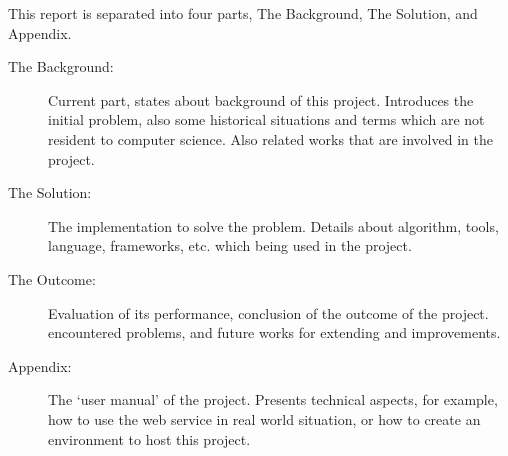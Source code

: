 This report is separated into four parts, The Background, The Solution,
and Appendix.

\begin{description}
\item[The Background:]
  Current part, states about background of this project. Introduces
  the initial problem, also some historical situations and terms
  which are not resident to computer science. Also related works
  that are involved in the project.
\item[The Solution:]
  The implementation to solve the problem. Details about algorithm,
  tools, language, frameworks, etc. which being used in the project.
\item[The Outcome:]
  Evaluation of its performance, conclusion of the outcome of the project.
  encountered problems, and future works for extending and improvements.
\item[Appendix:]
  The `user manual' of the project. Presents technical aspects,
  for example, how to use the web service in real world situation,
  or how to create an environment to host this project.
\end{description}
